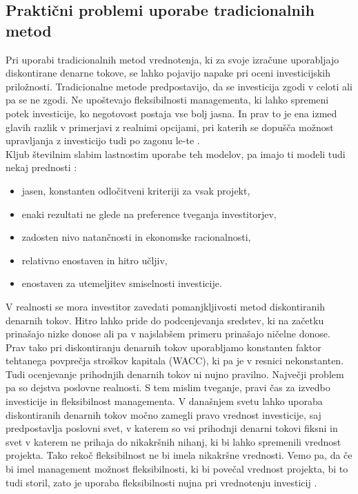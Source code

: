 \subsection{Praktični problemi uporabe tradicionalnih metod}
Pri uporabi tradicionalnih metod vrednotenja, ki za svoje izračune uporabljajo diskontirane denarne tokove, se lahko pojavijo napake pri oceni investicijskih priložnosti. Tradicionalne metode predpostavijo, da se investicija zgodi v celoti ali pa se ne zgodi. Ne upoštevajo fleksibilnosti managementa, ki lahko spremeni potek investicije, ko negotovost postaja vse bolj jasna. In prav to je ena izmed glavih razlik v primerjavi z realnimi opcijami, pri katerih se dopušča možnost upravljanja z investicijo tudi po zagonu le-te \cite[str. 65, 66]{Mun}.\\
Kljub številnim slabim lastnostim uporabe teh modelov, pa imajo ti modeli tudi nekaj prednosti \cite[str. 66]{Mun}:
\begin{itemize}
\item jasen, konstanten odločitveni kriteriji za vsak projekt,
\item enaki rezultati ne glede na preference tveganja investitorjev,
\item zadosten nivo natančnosti in ekonomske racionalnosti,
\item relativno enostaven in hitro učljiv,
\item enostaven za utemeljitev smiselnosti investicije.
\end{itemize}
V realnosti se mora investitor zavedati pomanjkljivosti metod diskontiranih denarnih tokov. Hitro lahko pride do podcenjevanja sredstev, ki na začetku prinašajo nizke donose ali pa v najslabšem primeru prinašajo ničelne donose. Prav tako pri diskontiranju denarnih tokov uporabljamo konstanten faktor tehtanega povprečja stroškov kapitala (WACC), ki pa je v resnici nekonstanten. Tudi ocenjevanje prihodnjih denarnih tokov ni nujno pravilno. Največji problem pa so dejstva poslovne realnosti. S tem mislim tveganje, pravi čas za izvedbo investicije in fleksibilnost managementa. V današnjem svetu lahko uporaba diskontiranih denarnih tokov močno zamegli pravo vrednost investicije, saj predpostavlja poslovni svet, v katerem so vsi prihodnji denarni tokovi fiksni in svet v katerem ne prihaja do nikakršnih nihanj, ki bi lahko spremenili vrednost projekta. Tako rekoč fleksibilnost ne bi imela nikakršne vrednosti. Vemo pa, da če bi imel management možnost fleksibilnosti, ki bi povečal vrednost projekta, bi to tudi storil, zato je uporaba fleksibilnosti nujna pri vrednotenju investicij \cite[str. 66]{Mun}.\\

